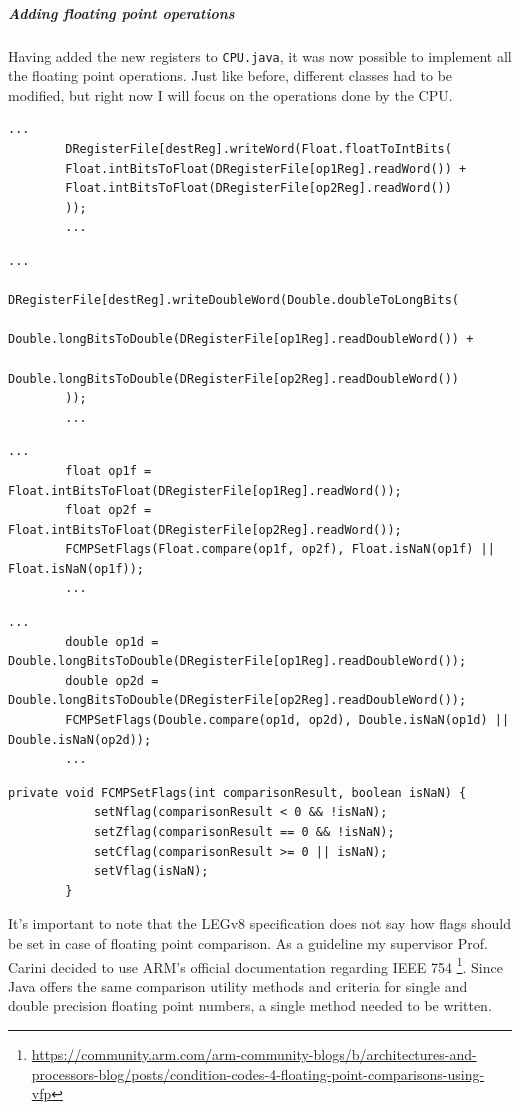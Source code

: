 \subparagraph*{Adding floating point operations}

Having added the new registers to \verb|CPU.java|, it was now possible to implement all the floating point operations. Just like before, different classes had to be modified, but right now I will focus on the operations done by the CPU.

	\begin{lstlisting}[caption={FADDS}]
		...
		DRegisterFile[destReg].writeWord(Float.floatToIntBits(
		Float.intBitsToFloat(DRegisterFile[op1Reg].readWord()) +
		Float.intBitsToFloat(DRegisterFile[op2Reg].readWord())
		));
		...
	\end{lstlisting}
	\begin{lstlisting}[caption={FADDD}]
		...
		DRegisterFile[destReg].writeDoubleWord(Double.doubleToLongBits(
		Double.longBitsToDouble(DRegisterFile[op1Reg].readDoubleWord()) +
		Double.longBitsToDouble(DRegisterFile[op2Reg].readDoubleWord())
		));
		...
	\end{lstlisting}
	\begin{lstlisting}[caption={FCMPS}]
		...
		float op1f = Float.intBitsToFloat(DRegisterFile[op1Reg].readWord());
		float op2f = Float.intBitsToFloat(DRegisterFile[op2Reg].readWord());
		FCMPSetFlags(Float.compare(op1f, op2f), Float.isNaN(op1f) || Float.isNaN(op1f));
		...
	\end{lstlisting}
	\begin{lstlisting}[caption={FCMPD}]
		...
		double op1d = Double.longBitsToDouble(DRegisterFile[op1Reg].readDoubleWord());
		double op2d = Double.longBitsToDouble(DRegisterFile[op2Reg].readDoubleWord());
		FCMPSetFlags(Double.compare(op1d, op2d), Double.isNaN(op1d) || Double.isNaN(op2d));
		...
	\end{lstlisting}
	\begin{lstlisting}[caption={Function for setting floating point comparison flags}]
		private void FCMPSetFlags(int comparisonResult, boolean isNaN) {
			setNflag(comparisonResult < 0 && !isNaN);
			setZflag(comparisonResult == 0 && !isNaN);
			setCflag(comparisonResult >= 0 || isNaN);
			setVflag(isNaN);
		}
	\end{lstlisting}
	
	It's important to note that the LEGv8 specification does not say how flags should be set in case of floating point comparison. As a guideline my supervisor Prof. Carini decided to use ARM's official documentation regarding IEEE 754 \footnote{\url{https://community.arm.com/arm-community-blogs/b/architectures-and-processors-blog/posts/condition-codes-4-floating-point-comparisons-using-vfp}}. Since Java offers the same comparison utility methods and criteria for single and double precision floating point numbers, a single method needed to be written.
	
